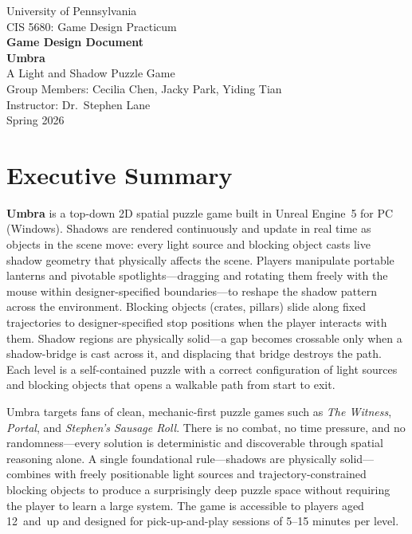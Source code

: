 \documentclass[11pt, letterpaper]{article}
\begin{document}
\begin{titlepage}
    \centering
    \vspace*{2cm}
    {\large University of Pennsylvania}\\[0.5em]
    {\large CIS 5680: Game Design Practicum}\\[3cm]
    {\LARGE \textbf{Game Design Document}}\\[1em]
    {\Huge \textbf{Umbra}}\\[0.5em]
    {\large A Light and Shadow Puzzle Game}\\[3cm]
    {\normalsize Group Members: Cecilia Chen, Jacky Park, Yiding Tian}\\[1em]
    {\normalsize Instructor: Dr.\ Stephen Lane}\\[1em]
    {\normalsize Spring 2026}
    \vfill
\end{titlepage}

\tableofcontents
\newpage

\section{Executive Summary}

\textbf{Umbra} is a top-down 2D spatial puzzle game built in Unreal Engine~5 for PC
(Windows). Shadows are rendered continuously and update in real time as objects in the
scene move: every light source and blocking object casts live shadow geometry that
physically affects the scene. Players manipulate portable lanterns and pivotable
spotlights---dragging and rotating them freely with the mouse within designer-specified
boundaries---to reshape the shadow pattern across the environment. Blocking objects
(crates, pillars) slide along fixed trajectories to
designer-specified stop positions when the player interacts with them. Shadow regions are
physically solid---a gap becomes crossable only when a shadow-bridge is cast across it,
and displacing that bridge destroys the path. Each level is a self-contained puzzle with
a correct configuration of light sources and blocking objects that opens a walkable path
from start to exit.

Umbra targets fans of clean, mechanic-first puzzle games such as \textit{The Witness},
\textit{Portal}, and \textit{Stephen's Sausage Roll}. There is no combat, no time
pressure, and no randomness---every solution is deterministic and discoverable through
spatial reasoning alone. A single foundational rule---shadows are physically solid---combines
with freely positionable light sources and trajectory-constrained blocking objects to
produce a surprisingly deep puzzle space without requiring the player to learn a large
system. The game is accessible to players aged
12~and~up and designed for pick-up-and-play sessions of 5--15 minutes per level.
\end{document}
